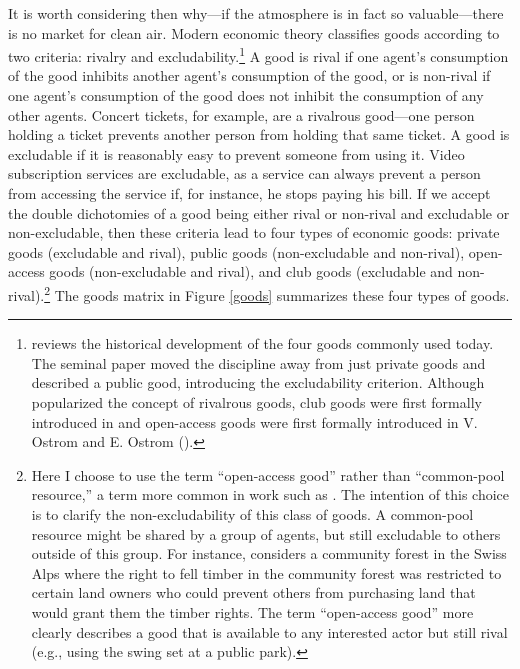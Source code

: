It is worth considering then why---if the atmosphere is in fact so valuable---there is no market for clean air. Modern economic theory classifies goods according to two criteria: rivalry and excludability.\footnote{\cite{ostrom2010beyond} reviews the historical development of the four goods commonly used today. The seminal paper \cite{samuelson1954pure} moved the discipline away from just private goods and described a public good, introducing the excludability criterion. Although \cite{hardin1968tragedy} popularized the concept of rivalrous goods, club goods were first formally introduced in \cite{buchanan1965economic} and open-access goods were first formally introduced in V. Ostrom and E. Ostrom (\citeyear{ostrom1977public}).} A good is rival if one agent's consumption of the good inhibits another agent's consumption of the good, or is non-rival if one agent's consumption of the good does not inhibit the consumption of any other agents. Concert tickets, for example, are a rivalrous good---one person holding a ticket prevents another person from holding that same ticket. A good is excludable if it is reasonably easy to prevent someone from using it. Video subscription services are excludable, as a service can always prevent a person from accessing the service if, for instance, he stops paying his bill. If we accept the double dichotomies of a good being either rival or non-rival and excludable or non-excludable, then these criteria lead to four types of economic goods: private goods (excludable and rival), public goods (non-excludable and non-rival), open-access goods (non-excludable and rival), and club goods (excludable and non-rival).\footnote{Here I choose to use the term ``open-access good'' rather than ``common-pool resource,'' a term more common in work such as \cite{ostrom1990governing}. The intention of this choice is to clarify the non-excludability of this class of goods. A common-pool resource might be shared by a group of agents, but still excludable to others outside of this group. For instance, \cite{ostrom1990governing} considers a community forest in the Swiss Alps where the right to fell timber in the community forest was restricted to certain land owners who could prevent others from purchasing land that would grant them the timber rights. The term ``open-access good'' more clearly describes a good that is available to any interested actor but still rival (e.g., using the swing set at a public park).} The goods matrix in Figure \ref{goods} summarizes these four types of goods.

